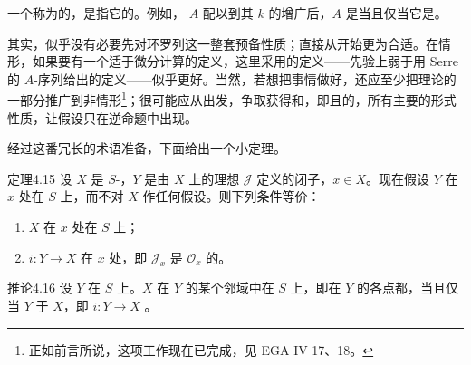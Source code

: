 一个称为的，是指它的。例如， $A$ 配以到其 $k$ 的增广后，$A$ 是当且仅当它是。

其实，似乎没有必要先对环罗列这一整套预备性质；直接从开始更为合适。在情形，如果要有一个适于微分计算的定义，这里采用的定义——先验上弱于用 Serre 的 $A$-序列给出的定义——似乎更好。当然，若想把事情做好，还应至少把理论的一部分推广到非情形\footnote{正如前言所说，这项工作现在已完成，见 EGA IV 17、18。}；很可能应从出发，争取获得和，即且的，所有主要的形式性质，让假设只在逆命题中出现。

经过这番冗长的术语准备，下面给出一个小定理。
\begin{SGAresult}{定理}{4.15}
设 $X$ 是 $S$-，$Y$ 是由 $X$ 上的理想 $\mathcal J$ 定义的闭子，$x\in X$。现在假设 $Y$ 在 $x$ 处在 $S$ 上，而不对 $X$ 作任何假设。则下列条件等价：
\begin{enumerate}
\item[(i)] $X$ 在 $x$ 处在 $S$ 上；
\item[(ii)]  $i:Y\to X$ 在 $x$ 处，即 $\mathcal J_x$ 是 $\mathcal O_x$ 的。
\end{enumerate}
\end{SGAresult}

\begin{SGAresult}{推论}{4.16}
设 $Y$ 在 $S$ 上。$X$ 在 $Y$ 的某个邻域中在 $S$ 上，即在 $Y$ 的各点都，当且仅当 $Y$ 于 $X$，即 $i:Y\to X$ 。
\end{SGAresult}


